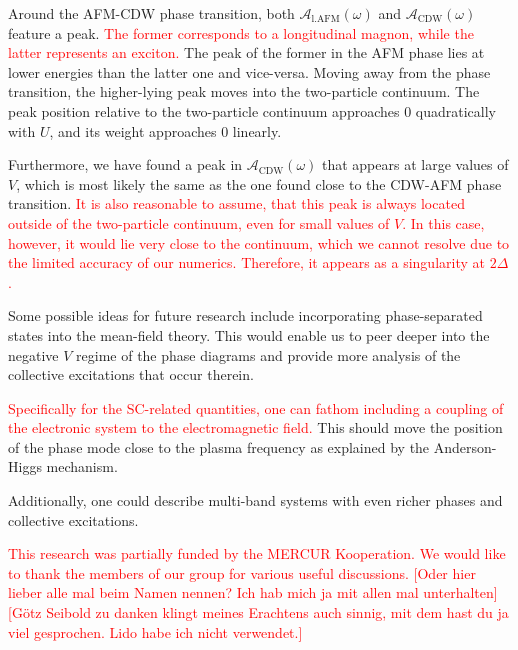 \documentclass[
    reprint, 
    aps,
    preprintnumbers,
    twocolumn,
    prb,
    superscriptaddress
]{revtex4-2}
\newcommand{\spectral}[1]{\mathcal{A}_\text{#1}  (\omega)}
\newcommand{\markEdited}{red}
\begin{document}
Around the AFM-CDW phase transition, both $\spectral{l.AFM}$ and $\spectral{CDW}$ feature a peak. 
\textcolor{\markEdited}{The former corresponds to a longitudinal magnon, while the latter represents an exciton.}
The peak of the former in the AFM phase lies at lower energies than the latter one and vice-versa. 
Moving away from the phase transition, the higher-lying peak moves into the two-particle continuum. 
The peak position relative to the two-particle continuum approaches $0$ quadratically with $U$, and its weight approaches $0$ linearly.

Furthermore, we have found a peak in $\spectral{CDW}$ that appears at large values of $V$, 
which is most likely the same as the one found close to the CDW-AFM phase transition. 
\textcolor{\markEdited}{It is also reasonable to assume, that this peak is always located outside of the two-particle continuum, even for small values of $V$.
In this case, however, it would lie very close to the continuum, which we cannot resolve due to the limited accuracy of our numerics.
Therefore, it appears as a singularity at $2\Delta$.}


Some possible ideas for future research include incorporating phase-separated states into the mean-field theory.
This would enable us to peer deeper into the negative $V$ regime of the phase diagrams and provide more analysis of the collective excitations that occur therein.

\textcolor{\markEdited}{Specifically for the SC-related quantities, one can fathom including a coupling of the electronic system to the electromagnetic field.}
This should move the position of the phase mode close to the plasma frequency as explained by the Anderson-Higgs mechanism.

Additionally, one could describe multi-band systems with even richer phases and collective excitations. 


\begin{acknowledgments} 
    \textcolor{\markEdited}{This research was partially funded by the MERCUR Kooperation.
    We would like to thank the members of our group for various useful discussions.
    [Oder hier lieber alle mal beim Namen nennen? Ich hab mich ja mit allen mal unterhalten]
    [Götz Seibold zu danken klingt meines Erachtens auch sinnig, mit dem hast du ja viel gesprochen.
    Lido habe ich nicht verwendet.]}
\end{acknowledgments}
\end{document}
